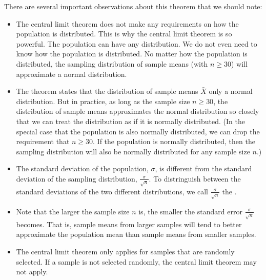 \documentclass[letterpaper,10pt,english]{jupyterBook}
\begin{document}
\sphinxAtStartPar
There are several important observations about this theorem that we should note:
\begin{itemize}
\item {} 
\sphinxAtStartPar
The central limit theorem does not make any requirements on how the population is distributed. This is why the central limit theorem is so powerful. The population can have any distribution. We do not even need to know how the population is distributed. No matter how the population is distributed, the sampling distribution of sample means (with \(n \geq 30\)) will approximate a normal distribution.

\item {} 
\sphinxAtStartPar
The theorem states that the distribution of sample means \(\bar{X}\) only  a normal distribution. But in practice, as long as the sample size \(n \geq 30\), the distribution of sample means approximates the normal distribution so closely that we can treat the distribution as if it is normally distributed. (In the special case that the population is also normally distributed, we can drop the requirement that \(n \geq 30\). If the population is normally distributed, then the sampling distribution will also be normally distributed for any sample size \(n\).)

\item {} 
\sphinxAtStartPar
The standard deviation of the population, \(\sigma\), is different from the standard deviation of the sampling distribution, \(\frac{\sigma}{\sqrt{n}}\). To distringuish between the standard deviations of the two different distributions, we call \(\frac{\sigma}{\sqrt{n}}\) the .

\item {} 
\sphinxAtStartPar
Note that the larger the sample size \(n\) is, the smaller the standard error \(\frac{\sigma}{\sqrt{n}}\) becomes. That is, sample means from larger samples will tend to better approximate the population mean than sample means from smaller samples.

\item {} 
\sphinxAtStartPar
The central limit theorem only applies for samples that are randomly selected. If a sample is not selected randomly, the central limit theorem may not apply.

\end{itemize}
\end{document}
